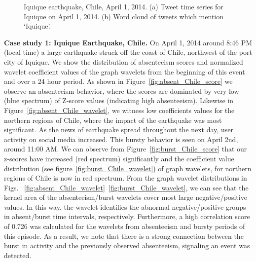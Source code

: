\documentclass[conference]{IEEEtran}
\begin{document}
\begin{figure}[t]
	\centering
	\caption{Iquique earthquake, Chile, April 1, 2014. (a) Tweet time series for Iquique on April 1, 2014. (b) Word cloud of tweets which mention `Iquique'.}
\label{fig:case1_cloud}
\end{figure}

\textbf{Case study 1: Iquique Earthquake, Chile.}
On April 1, 2014 around 8:46 PM (local time) a large earthquake struck off the coast of Chile, northwest of the port city of Iquique.
We show the distribution of absenteeism scores and normalized wavelet coefficient values of the graph wavelets from the beginning of this event and over a 24 hour period.
As shown in Figure~\ref{fig:absent_Chile_score} we observe an absenteeism behavior, where the scores are dominated by very low (blue spectrum) of Z-score values (indicating high absenteeism).
Likewise in Figure~\ref{fig:absent_Chile_wavelet}, we witness low coefficients values for the northern regions of Chile, where the impact of the earthquake was most significant.
As the news of earthquake spread throughout the next day, user activity on social media increased. This bursty behavior is seen on April 2nd, around 11:00 AM. We can observe from Figure~\ref{fig:burst_Chile_score} that our z-scores have increased (red spectrum) significantly and the coefficient value distribution (see figure~\ref{fig:burst_Chile_wavelet}) of graph wavelets, for northern regions of Chile is now in red spectrum.
From the graph wavelet distributions in Figs. ~\ref{fig:absent_Chile_wavelet}~\ref{fig:burst_Chile_wavelet}, we can see that the kernel area of the absenteeism/burst wavelets cover most large negative/positive values.
In this way, the wavelet identifies the abnormal negative/positive groups in absent/burst time intervals, respectively.
Furthermore, a high correlation score of 0.726 was calculated for the wavelets from absenteeism and bursty periods of this episode.
As a result, we note that there is a strong connection between the burst in activity and the previously observed absenteeism, signaling an event was detected.
\end{document}
